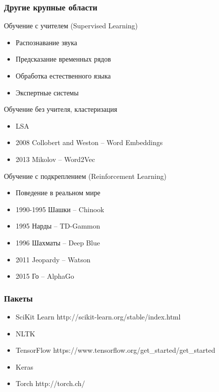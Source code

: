 \documentclass[fullscreen=true, bookmarks=false]{beamer} %
\begin{document}
\begin{frame}{}
\frametitle{Другие крупные области}

Обучение с учителем (Supervised Learning)
\begin{itemize}
\item Распознавание звука
\item Предсказание временных рядов
\item Обработка естественного языка
\item Экспертные системы
\end{itemize}

Обучение без учителя, кластеризация
\begin{itemize}
\item LSA
\item 2008 Collobert and Weston -- Word Embeddings
\item 2013 Mikolov -- Word2Vec
\end{itemize}

Обучение с подкреплением (Reinforcement Learning)
\begin{itemize}
\item Поведение в реальном мире
\item 1990-1995 Шашки -- Chinook 
\item 1995 Нарды -- TD-Gammon 
\item 1996 Шахматы -- Deep Blue 
\item 2011 Jeopardy -- Watson
\item 2015 Го -- AlphaGo
\end{itemize}

\end{frame}


\begin{frame}
\frametitle{Пакеты}

\begin{itemize}
\item SciKit Learn http://scikit-learn.org/stable/index.html
\item NLTK
\item TensorFlow https://www.tensorflow.org/get\_started/get\_started
\item Keras
\item Torch http://torch.ch/
\end{itemize}

\end{frame}

\end{document}
